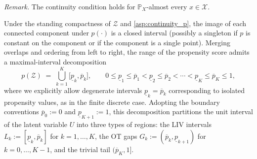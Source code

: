 \noindent\textit{Remark.} The continuity condition holds for $\mathbb P_X$-almost every $x\in\mathcal X$.


Under the standing compactness of $\mathcal Z$ and \cref{asp:continuity_p}, the image of each connected component under $p(\cdot)$ is a closed interval (possibly a singleton if $p$ is constant on the component or if the component is a single point). Merging overlaps and ordering from left to right, the range of the propensity score admits a maximal-interval decomposition
\begin{equation}\label{eq:range_decomposition}
    p(\mathcal{Z}) \;=\; \bigcup_{k=1}^{K}\bigl[\underline{p}_k,\overline{p}_k\bigr], \qquad 0 \leqslant \underline{p}_1 \leqslant \overline{p}_1 < \underline{p}_2 \leqslant \overline{p}_2 < \cdots < \underline{p}_K \leqslant \overline{p}_K \leqslant 1,
\end{equation}
where we explicitly allow degenerate intervals $\underline{p}_k = \overline{p}_k$ corresponding to isolated propensity values, as in the finite discrete case. Adopting the boundary conventions $\overline{p}_0 := 0$ and $\underline{p}_{K+1} := 1$, this decomposition partitions the unit interval of the latent variable $U$ into three types of regions: the LIV intervals $L_k := [\underline{p}_k,\overline{p}_k]$ for $k=1,\dots,K$, the OT gaps $G_k := (\overline{p}_k, \underline{p}_{k+1})$ for $k=0,\dots,K-1$, and the trivial tail $(\overline{p}_K,1]$.

